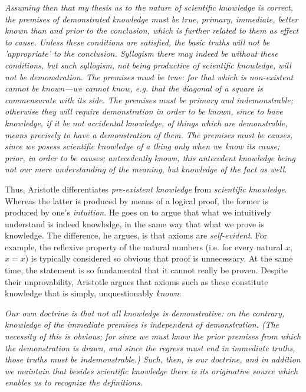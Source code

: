 \begin{displayquote}
	\textit{Assuming then that my thesis as to the nature of scientific knowledge is correct, the premises of demonstrated knowledge must be true, primary, immediate, better known than and prior to the conclusion, which is further related to them as effect to cause. Unless these conditions are satisfied, the basic truths will not be 'appropriate' to the conclusion. Syllogism there may indeed be without these conditions, but such syllogism, not being productive of scientific knowledge, will not be demonstration. The premises must be true: for that which is non-existent cannot be known---we cannot know, e.g. that the diagonal of a square is commensurate with its side. The premises must be primary and indemonstrable; otherwise they will require demonstration in order to be known, since to have knowledge, if it be not accidental knowledge, of things which are demonstrable, means precisely to have a demonstration of them. The premises must be causes, since we posess scientific knowledge of a thing only when we know its cause; prior, in order to be causes; antecedently known, this antecedent knowledge being not our mere understanding of the meaning, but knowledge of the fact as well.}
	\vspace{4mm}
\end{displayquote}

Thus, Aristotle differentiates \textit{pre-existent knowledge} from \textit{scientific knowledge}. Whereas the latter is produced by means of a logical proof, the former is produced by one's \textit{intuition}. He goes on to argue that what we intuitively understand is indeed knowledge, in the same way that what we prove is knowledge. The difference, he argues, is that axioms are \textit{self-evident}. For example, the reflexive property of the natural numbers (i.e. for every natural $x$, $x=x$) is typically considered so obvious that proof is unnecessary. At the same time, the statement is so fundamental that it cannot really be proven. Despite their unprovability, Aristotle argues that axioms such as these constitute knowledge that is simply, unquestionably \textit{known}: \\

\begin{displayquote}
	\textit{Our own doctrine is that not all knowledge is demonstrative: on the contrary, knowledge of the immediate premises is independent of demonstration. (The necessity of this is obvious; for since we must know the prior premises from which the demonstration is drawn, and since the regress must end in immediate truths, those truths must be indemonstrable.) Such, then, is our doctrine, and in addition we maintain that besides scientific knowledge there is its originative source which enables us to recognize the definitions.}
	\vspace{4mm}
\end{displayquote}

